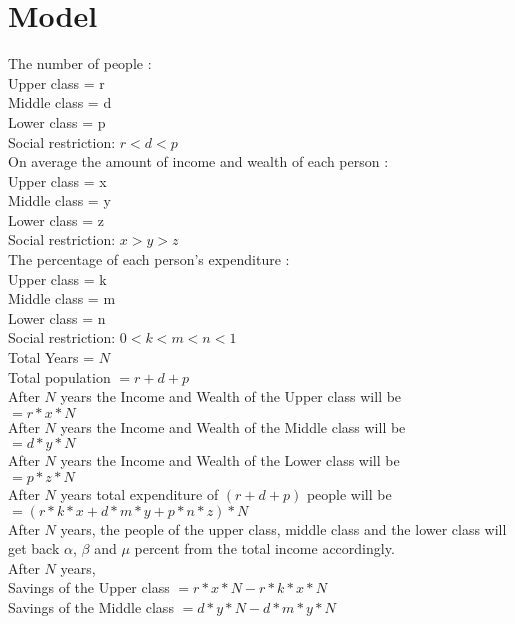 \documentclass[12pt,a4paper]{article}
\begin{document}
	\section{Model}
	The number of people :
   \\Upper  class = r
   \\Middle class = d 
   \\Lower  class = p 
   \\Social restriction: $ r < d < p $
   \medskip 
   \\On average the amount of income and wealth of each person :
   \\Upper  class = x
   \\Middle class = y
   \\Lower  class = z
   \\Social restriction: $ x > y > z $
   \medskip 
   \\The percentage of each person's expenditure  :
   \\Upper  class = k
   \\Middle class = m 
   \\Lower  class = n 
   \\Social restriction: $ 0 < k < m < n < 1 $
   \medskip 
   \\Total Years = $N$
   \medskip
   \\Total population $= r + d + p$
   \medskip
   \\After $N$ years the Income and Wealth of the Upper class will be
   \\$=r{\ast}x{\ast}N$ 
   \\After $N$ years the Income and Wealth of the Middle class will be
   \\$=d{\ast}y{\ast}N$
   \\After $N$ years the Income and Wealth of the Lower class will be
   \\$=p{\ast}z{\ast}N$
   \medskip
   \\After $N$ years total expenditure of $(r + d + p)$ people will be 
   \\$=(r{\ast}k{\ast}x + d{\ast}m{\ast}y + p{\ast}n{\ast}z){\ast}N$
   \\After $N$ years, the people of the upper class, middle class and the lower class will get back $\alpha$, $\beta$ and $\mu$ percent from the total income accordingly.
   \medskip
   \\After $N$ years,
   \\Savings of the Upper  class $=r{\ast}x{\ast}N -r{\ast}k{\ast}x{\ast}N$
   \\Savings of the Middle class $=d{\ast}y{\ast}N -d{\ast}m{\ast}y{\ast}N$
\end{document}
